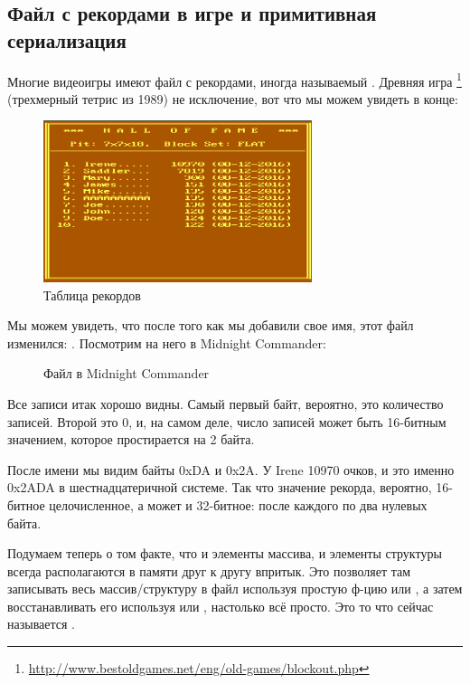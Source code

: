 \subsection{Файл с рекордами в игре  и примитивная сериализация}

Многие видеоигры имеют файл с рекордами, иногда называемый .
Древняя игра \footnote{\url{http://www.bestoldgames.net/eng/old-games/blockout.php}}
(трехмерный тетрис из 1989) не исключение, вот что мы можем увидеть в конце:

\begin{figure}[H]
\centering
\includegraphics[width=0.7\textwidth]{advanced/550_more_structs/blockout/hs.png}
\caption{Таблица рекордов}
\end{figure}

Мы можем увидеть, что после того как мы добавили свое имя, этот файл изменился: .
Посмотрим на него в Midnight Commander:

\begin{figure}[H]
\centering
{}
\caption{Файл  в Midnight Commander}
\end{figure}

Все записи итак хорошо видны.
Самый первый байт, вероятно, это количество записей.
Второй это 0, и, на самом деле, число записей может быть 16-битным значением, которое простирается на 2 байта.

После имени  мы видим байты 0xDA и 0x2A.
У Irene 10970 очков, и это именно 0x2ADA в шестнадцатеричной системе.
Так что значение рекорда, вероятно, 16-битное целочисленное, а может и 32-битное: после каждого по два нулевых байта.

Подумаем теперь о том факте, что и элементы массива, и элементы структуры всегда располагаются в памяти друг к другу впритык.
Это позволяет там записывать весь массив/структуру в файл используя простую ф-цию  или , 
а затем восстанавливать его используя  или , настолько всё просто.
Это то что сейчас называется .

